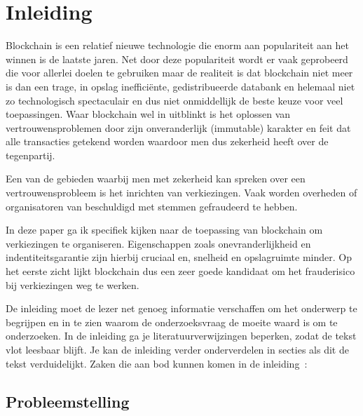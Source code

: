 
\chapter*{Inleiding}
\label{ch:inleiding}

Blockchain is een relatief nieuwe technologie die enorm aan populariteit aan het winnen is de laatste jaren. Net door deze populariteit wordt er vaak geprobeerd die voor allerlei doelen te gebruiken maar de realiteit is dat blockchain niet meer is dan een trage, in opslag inefficiënte, gedistribueerde databank en helemaal niet zo technologisch spectaculair en dus niet onmiddellijk de beste keuze voor veel toepassingen. Waar blockchain wel in uitblinkt is het oplossen van vertrouwensproblemen door zijn onveranderlijk (immutable) karakter en feit dat alle transacties getekend worden waardoor men dus zekerheid heeft over de tegenpartij. 

Een van de gebieden waarbij men met zekerheid kan spreken over een vertrouwensprobleem is het inrichten van verkiezingen. Vaak worden overheden of organisatoren van beschuldigd met stemmen gefraudeerd te hebben. 

In deze paper ga ik specifiek kijken naar de toepassing van blockchain om verkiezingen te organiseren. Eigenschappen zoals onevranderlijkheid en indentiteitsgarantie zijn hierbij cruciaal en, snelheid en opslagruimte minder. Op het eerste zicht lijkt blockchain dus een zeer goede kandidaat om het frauderisico bij verkiezingen weg te werken.

De inleiding moet de lezer net genoeg informatie verschaffen om het onderwerp te begrijpen en in te zien waarom de onderzoeksvraag de moeite waard is om te onderzoeken. In de inleiding ga je literatuurverwijzingen beperken, zodat de tekst vlot leesbaar blijft. Je kan de inleiding verder onderverdelen in secties als dit de tekst verduidelijkt. Zaken die aan bod kunnen komen in de inleiding~\autocite{Pollefliet2011}:

\section{Probleemstelling}
\label{sec:probleemstelling}

